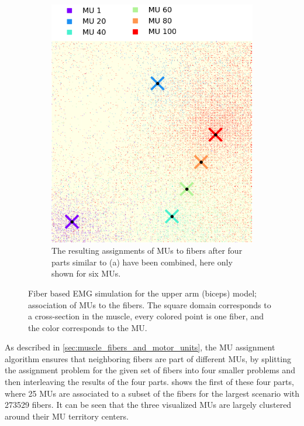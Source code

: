 \begin{figure}
\begin{subfigure}[t]{0.47\textwidth}
    \includegraphics[width=\textwidth]{images/results/application/MU_fibre_distribution_523x523_100mus_txt_2d_fiber_distribution_.png}%
    \caption{The resulting assignments of MUs to fibers after four parts similar to (a) have been combined, here only shown for six MUs.}%
    \label{fig:mu_assignment_total}%
  \end{subfigure} 
  \caption{Fiber based EMG simulation for the upper arm (biceps) model; association of MUs to the fibers. The square domain corresponds to a cross-section in the muscle, every colored point is one fiber, and the color corresponds to the MU. }%
  \label{fig:mu_assignment_100}%
\end{figure}%

As described in \cref{sec:muscle_fibers_and_motor_units}, the MU assignment algorithm ensures that neighboring fibers are part of different MUs, by splitting the assignment problem for the given set of fibers into four smaller problems and then interleaving the results of the four parts.  shows the first of these four parts, where 25 MUs are associated to a subset of the fibers for the largest scenario with \num{273529} fibers. It can be seen that the three visualized MUs are largely clustered around their MU territory centers.

